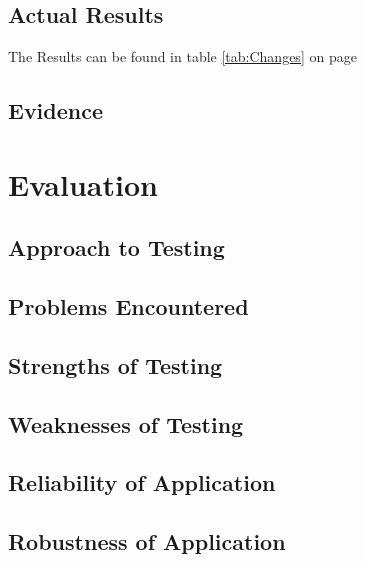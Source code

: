 \begin{landscape}
\subsection{Actual Results}
The Results can be found in table \ref{tab:Changes} on page \pageref{tab:Changes}
\subsection{Evidence}

\end{landscape}

\section{Evaluation}

\subsection{Approach to Testing}

\subsection{Problems Encountered}

\subsection{Strengths of Testing}

\subsection{Weaknesses of Testing}

\subsection{Reliability of Application}

\subsection{Robustness of Application}
